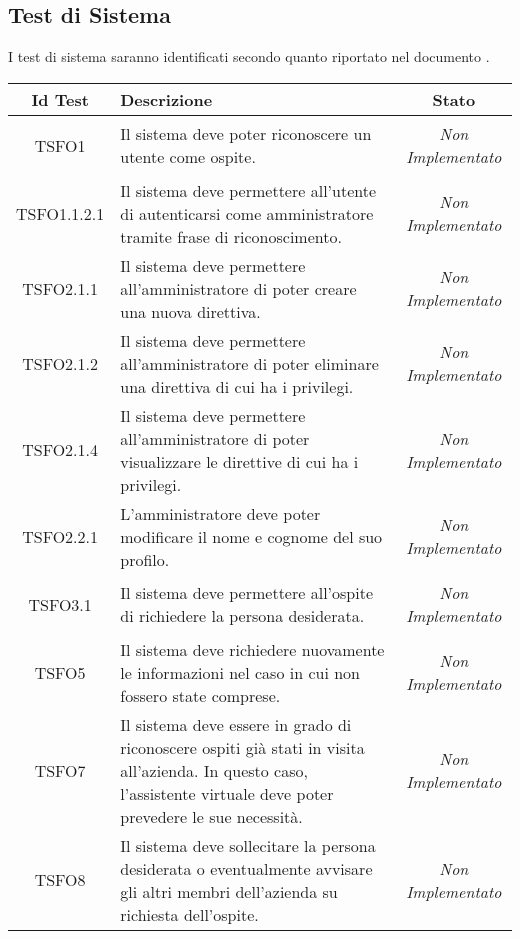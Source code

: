 \subsection{Test di Sistema}
I test di sistema saranno identificati secondo quanto riportato nel documento \NPdoc{}.
\normalsize
\begin{longtable}{|c|>{}m{8cm}|c|}

\hline
\textbf{Id Test} & \textbf{Descrizione} & \textbf{Stato}\\
\hline
\endhead
\hypertarget{TSFO1}{TSFO1} & Il sistema deve poter riconoscere un utente come ospite. & \textit{Non Implementato}\\ \hline
\hypertarget{TSFO1.1.2.1}{TSFO1.1.2.1} & Il sistema deve permettere all'utente di autenticarsi come amministratore tramite frase di riconoscimento. & \textit{Non Implementato}\\ \hline
\hypertarget{TSFO2.1.1}{TSFO2.1.1} & Il sistema deve permettere all'amministratore di poter creare una nuova direttiva. & \textit{Non Implementato}\\ \hline
\hypertarget{TSFO2.1.2}{TSFO2.1.2} & Il sistema deve permettere all'amministratore di poter eliminare una direttiva di cui ha i privilegi. & \textit{Non Implementato}\\ \hline
\hypertarget{TSFO2.1.4}{TSFO2.1.4} & Il sistema deve permettere all'amministratore di poter visualizzare le direttive di cui ha i privilegi. & \textit{Non Implementato}\\ \hline
\hypertarget{TSFO2.2.1}{TSFO2.2.1} & L'amministratore deve poter modificare il nome e cognome del suo profilo. & \textit{Non Implementato}\\ \hline
\hypertarget{TSFO3.1}{TSFO3.1} & Il sistema deve permettere all'ospite di richiedere la persona desiderata. & \textit{Non Implementato}\\ \hline
\hypertarget{TSFO5}{TSFO5} & Il sistema deve richiedere nuovamente le informazioni nel caso in cui non fossero state comprese. & \textit{Non Implementato}\\ \hline
\hypertarget{TSFO7}{TSFO7} & Il sistema deve essere in grado di riconoscere ospiti già stati in visita all'azienda. In questo caso, l'assistente virtuale deve poter prevedere le sue necessità. & \textit{Non Implementato}\\ \hline
\hypertarget{TSFO8}{TSFO8} & Il sistema deve sollecitare la persona desiderata o eventualmente avvisare gli altri membri dell'azienda su richiesta dell'ospite. & \textit{Non Implementato}\\ \hline

\end{longtable}
